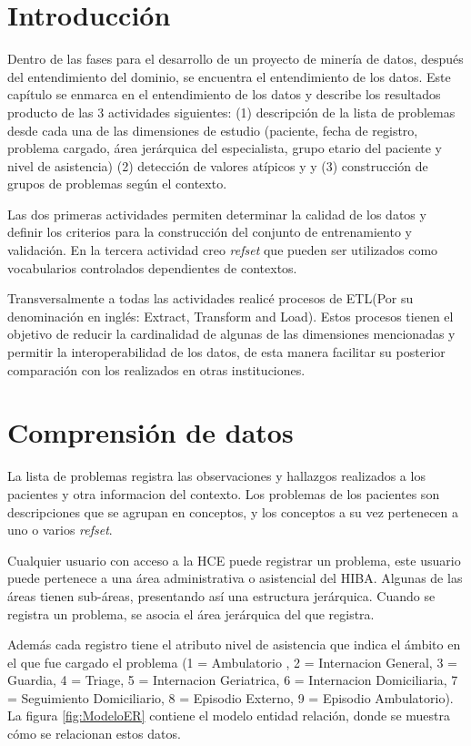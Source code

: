 \section{Introducción}
Dentro de las fases para el desarrollo de un proyecto de minería de datos, después del entendimiento del dominio, se encuentra el entendimiento de los datos. Este capítulo se enmarca en el entendimiento de los datos y describe los resultados producto de las 3 actividades siguientes: (1) descripción de la lista de problemas desde cada una de las dimensiones de estudio (paciente, fecha de registro, problema cargado, área jerárquica del especialista, grupo etario del paciente y nivel de asistencia) (2) detección de valores atípicos y y (3) construcción de grupos de problemas según el contexto. 

Las dos primeras actividades permiten determinar la calidad de los datos y definir los criterios para la construcción del conjunto de entrenamiento y validación. En la tercera actividad creo \textit{\acrshort{refset}} que pueden ser utilizados como vocabularios controlados dependientes de contextos.

Transversalmente a todas las actividades realicé procesos de \acrfull{ETL}(Por su denominación en inglés: Extract, Transform and Load). Estos procesos tienen el objetivo de reducir la cardinalidad de algunas de las dimensiones mencionadas y permitir la interoperabilidad de los datos, de esta manera facilitar su posterior comparación con los realizados en otras instituciones.

\section{Comprensión de datos}
La lista de problemas registra las observaciones y hallazgos realizados a los pacientes y otra informacion del contexto. Los problemas de los pacientes son descripciones que se agrupan en conceptos, y los conceptos a su vez pertenecen a uno o varios \textit{\acrshort{refset}}.

Cualquier usuario con acceso a la \acrshort{HCE} puede registrar un problema, este usuario puede pertenece a una área administrativa o asistencial del \acrshort{HIBA}. Algunas de las áreas tienen sub-áreas, presentando así una estructura jerárquica. Cuando se registra un problema, se asocia el área jerárquica del que registra.

Además cada registro tiene el atributo nivel de asistencia que indica el ámbito en el que fue cargado el problema (1 = Ambulatorio , 2 = Internacion General, 3 = Guardia, 4 = Triage, 5 = Internacion Geriatrica, 6 = Internacion Domiciliaria, 7 = Seguimiento Domiciliario, 8 = Episodio Externo, 9 = Episodio Ambulatorio). La figura \ref{fig:ModeloER} contiene el modelo entidad relación, donde se muestra cómo se relacionan estos datos.

